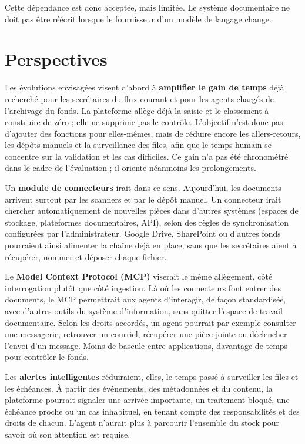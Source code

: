 Cette dépendance est donc acceptée, mais limitée. Le système documentaire ne doit pas être réécrit lorsque le fournisseur d'un modèle de langage change.

\section{Perspectives}

Les évolutions envisagées visent d'abord à \textbf{amplifier le gain de temps} déjà recherché pour les secrétaires du flux courant et pour les agents chargés de l'archivage du fonds. La plateforme allège déjà la saisie et le classement à construire de zéro ; elle ne supprime pas le contrôle. L'objectif n'est donc pas d'ajouter des fonctions pour elles-mêmes, mais de réduire encore les allers-retours, les dépôts manuels et la surveillance des files, afin que le temps humain se concentre sur la validation et les cas difficiles. Ce gain n'a pas été chronométré dans le cadre de l'évaluation ; il oriente néanmoins les prolongements.

Un \textbf{module de connecteurs} irait dans ce sens. Aujourd'hui, les documents arrivent surtout par les scanners et par le dépôt manuel. Un connecteur irait chercher automatiquement de nouvelles pièces dans d'autres systèmes (espaces de stockage, plateformes documentaires, API), selon des règles de synchronisation configurées par l'administrateur. Google Drive, SharePoint ou d'autres fonds pourraient ainsi alimenter la chaîne déjà en place, sans que les secrétaires aient à récupérer, nommer et déposer chaque fichier.

Le \textbf{Model Context Protocol (MCP)} viserait le même allègement, côté interrogation plutôt que côté ingestion. Là où les connecteurs font entrer des documents, le MCP permettrait aux agents d'interagir, de façon standardisée, avec d'autres outils du système d'information, sans quitter l'espace de travail documentaire. Selon les droits accordés, un agent pourrait par exemple consulter une messagerie, retrouver un courriel, récupérer une pièce jointe ou déclencher l'envoi d'un message. Moins de bascule entre applications, davantage de temps pour contrôler le fonds.

Les \textbf{alertes intelligentes} réduiraient, elles, le temps passé à surveiller les files et les échéances. À partir des événements, des métadonnées et du contenu, la plateforme pourrait signaler une arrivée importante, un traitement bloqué, une échéance proche ou un cas inhabituel, en tenant compte des responsabilités et des droits de chacun. L'agent n'aurait plus à parcourir l'ensemble du stock pour savoir où son attention est requise.

